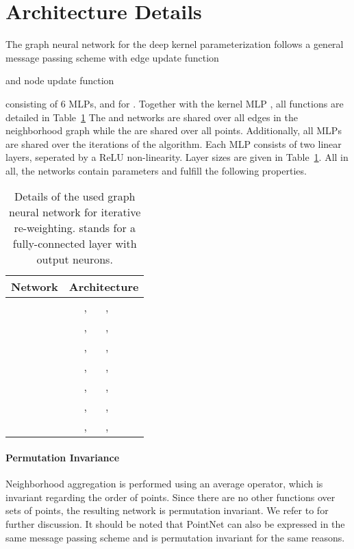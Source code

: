 \documentclass[10pt,twocolumn,letterpaper]{article}
\begin{document}
\section{Architecture Details}
\label{sec:architecture}
The graph neural network for the deep kernel parameterization follows a general message passing scheme \cite{Fey:2019} with edge update function

and node update function


consisting of 6 MLPs,  and  for . Together with the kernel MLP , all functions are detailed in Table~\ref{tab:architecture_details}
The  and  networks are shared over all edges in the neighborhood graph while the  are shared over all points. Additionally, all MLPs are  shared over the iterations of the algorithm. Each MLP consists of two linear layers, seperated by a ReLU non-linearity. Layer sizes are given in \mbox{Table \ref{tab:architecture_details}}. All in all, the networks contain  parameters and fulfill the following properties.
\begin{table}[h]
  \centering
\begin{tabular}{l|rcl}
      \toprule
                                     Network     &   \multicolumn{3}{c}{Architecture} \\ \midrule
   &  , & , &   \\ 
   &  , & , &   \\ 
 &  , &  , &    \\ 
   &  , &  , &   \\ 
   & , &  , &     \\
   & , &  , &    \\ 
   & , &  , &    \\
\bottomrule
\end{tabular}
\caption{Details of the used graph neural network for iterative re-weighting.  stands for a fully-connected layer with  output neurons.} \label{tab:architecture_details}
\end{table}


\paragraph{Permutation Invariance}
Neighborhood aggregation is performed using an average operator, which is invariant regarding the order of points. Since there are no other functions over sets of points, the resulting network is permutation invariant. We refer to \cite{Qi:2017} for further discussion. It should be noted that PointNet can also be expressed in the same message passing scheme and is permutation invariant for the same reasons.
\end{document}
